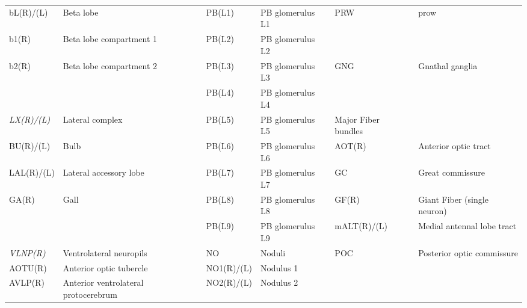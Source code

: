 \documentclass{article}
\begin{document}
\begin{center}
\begin{longtable}{llllll}
\hspace*{0.8em}bL(R)/(L) & Beta lobe & \hspace*{1.6em}PB(L1) & PB glomerulus L1 & \hspace*{0.8em}PRW & prow \\
\hspace*{1.6em}b1(R) & Beta lobe compartment 1 & \hspace*{1.6em}PB(L2) & PB glomerulus L2 &  &  \\
\hspace*{1.6em}b2(R) & Beta lobe compartment 2 & \hspace*{1.6em}PB(L3) & PB glomerulus L3 & GNG & Gnathal ganglia \\
 &  & \hspace*{1.6em}PB(L4) & PB glomerulus L4 &  &  \\
\emph{LX(R)/(L)} & Lateral complex & \hspace*{1.6em}PB(L5) & PB glomerulus L5 & Major Fiber bundles &  \\
\hspace*{0.8em}BU(R)/(L) & Bulb & \hspace*{1.6em}PB(L6) & PB glomerulus L6 & \hspace*{0.8em}AOT(R) & Anterior optic tract \\
\hspace*{0.8em}LAL(R)/(L) & Lateral accessory lobe & \hspace*{1.6em}PB(L7) & PB glomerulus L7 & \hspace*{0.8em}GC & Great commissure \\
\hspace*{1.6em}GA(R) & Gall & \hspace*{1.6em}PB(L8) & PB glomerulus L8 & \hspace*{0.8em}GF(R) & Giant Fiber (single neuron) \\
 &  & \hspace*{1.6em}PB(L9) & PB glomerulus L9 & \hspace*{0.8em}mALT(R)/(L) & Medial antennal lobe tract \\
\emph{VLNP(R)} & Ventrolateral neuropils & \hspace*{0.8em}NO & Noduli & \hspace*{0.8em}POC & Posterior optic commissure \\
\hspace*{0.8em}AOTU(R) & Anterior optic tubercle & \hspace*{1.6em}NO1(R)/(L) & Nodulus 1 &  &  \\
\hspace*{0.8em}AVLP(R) & Anterior ventrolateral protocerebrum & \hspace*{1.6em}NO2(R)/(L) & Nodulus 2 &  &  \\
\end{longtable}
\end{center}
\end{document}
